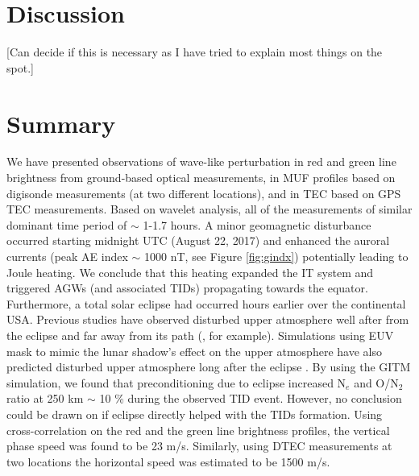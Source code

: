 
\section{Discussion}
[Can decide if this is necessary as I have tried to explain most things on the spot.]

\section{Summary}
We have presented observations of wave-like perturbation in red and green line brightness from ground-based optical measurements, in MUF profiles based on digisonde measurements (at two different locations), and in TEC based on GPS TEC measurements. Based on wavelet analysis, all of the measurements of similar dominant time period of $\sim$ 1-1.7 hours.  A minor geomagnetic disturbance occurred starting midnight UTC (August 22, 2017) and enhanced the auroral currents (peak AE index $\sim$ 1000 nT, see Figure \ref{fig:gindx}) potentially leading to Joule heating. We conclude that this heating expanded the IT system and triggered AGWs (and associated TIDs) propagating towards the equator. Furthermore, a total solar eclipse had occurred hours earlier over the continental USA. Previous studies have observed disturbed upper atmosphere well after from the eclipse and far away from its path (\citet{harding_nightside_eclipse,eclipse_belg}, for example). Simulations using EUV mask to mimic the lunar shadow's effect on the upper atmosphere have also predicted disturbed upper atmosphere long after the eclipse \citep{huba_drob_2017}. By using the GITM simulation, we found that preconditioning due to eclipse increased N$_e$ and O/N$_2$ ratio at 250 km $\sim$ 10 \% during the observed TID event. However, no conclusion could be drawn on if eclipse directly helped with the TIDs formation. Using cross-correlation on the red and the green line brightness profiles, the vertical phase speed was found to be 23 m/s. Similarly, using DTEC measurements at two locations the horizontal speed was estimated to be 1500 m/s.
